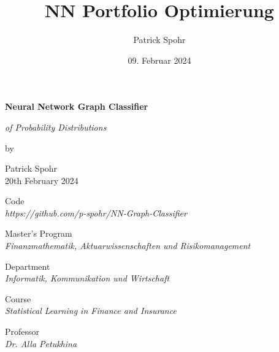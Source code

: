 \documentclass[12pt]{article}
\title{NN Portfolio Optimierung}
\date{09. Februar 2024}
\author{Patrick Spohr}
\begin{document}
    \begin{titlepage}
        
        \centering
        \Huge \textbf{Neural Network Graph Classifier}

        \vspace{7mm}
        
        \centering
        \Large \textit{of Probability Distributions} 

        \vspace{7mm}

        \centering
        \large by

        \vspace{7mm}

        \large Patrick Spohr
        \vspace{2mm}
        \\ 20th February 2024

        \vspace{10mm}

        \centering
        \large Code
        \vspace{1mm}
        \\ \normalsize \textit{https://github.com/p-spohr/NN-Graph-Classifier} 
        
        \vspace{20mm}

        \centering
        \large Master’s Program
        \vspace{1mm}
        \\ \normalsize \textit{Finanzmathematik, Aktuarwissenschaften und Risikomanagement} 

        \vspace{5mm}

        \centering
        \large Department
        \vspace{1mm}
        \\ \normalsize \textit{Informatik, Kommunikation und Wirtschaft} 

        \vspace{5mm}

        \centering
        \large Course 
        \vspace{1mm}       
        \\ \normalsize \textit{Statistical Learning in Finance and Insurance} 

        \vspace{5mm}

        \centering
        \large Professor
        \vspace{1mm}
        \\ \normalsize \textit{Dr. Alla Petukhina} 


    \end{titlepage}
\end{document}
